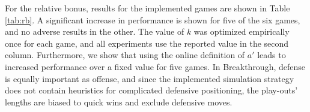 \documentclass{ecai2014}
\begin{document}
\begin{table}
{\caption{Relative Bonus enabled using different search times, 5000 games} \label{tab:rb}}
\begin{center}
\tabcolsep=0.15cm
\end{center}
\end{table}
For the relative bonus, results for the implemented games are shown in Table \ref{tab:rb}. A significant increase in performance is shown for five of the six games, and no adverse results in the other. The value of $k$ was optimized empirically once for each game, and all experiments use the reported value in the second column. Furthermore, we show that using the online definition of $a'$ leads to increased performance over a fixed value for five games. In Breakthrough, defense is equally important as offense, and since the implemented simulation strategy does not contain heuristics for complicated defensive positioning, the play-outs' lengths are biased to quick wins and exclude defensive moves.
\end{document}
